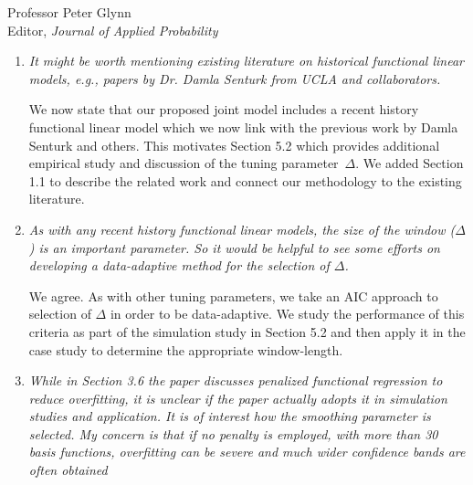 \documentclass[11pt]{letter} %
\begin{document}
\begin{letter}{Professor
	Peter Glynn\\
	Editor, {\em Journal of Applied Probability}}
\begin{enumerate}
\vspace{5mm}
We have added a detailed discussion of related work in Section 1.1, which includes the specific suggestions on relevant works provided by the second referee; specifically, we discuss recent modeling of time-to-event data with functional covariates as well as joint modelling from a functional regression perspective.  We contrast these approaches with our design-based approach which becomes necessary when considering high-frequency sensor processes rather than traditional longitudinal studies as the number of measurement occasions increase from tens to thousands/millions of times per individual.  We connect and contrast our use of subsampling with the general use of subsampling in handling massive data and its recent use in massive data with functional predictors.
\vspace{5mm}

\item {\it It might be worth mentioning existing literature on historical functional linear models, e.g., papers by Dr. Damla Senturk from UCLA and collaborators.}

\vspace{5mm}
We now state that our proposed joint model includes a recent history functional linear model which we now link with the previous work by Damla Senturk and others.  This motivates Section 5.2 which provides additional empirical study and discussion of the tuning parameter~$\Delta$.
We added Section 1.1 to describe the related work and connect our methodology to the existing literature.
\vspace{5mm}

\item {\it As with any recent history functional linear models, the size of the window ($\Delta$) is an important parameter. So it would be helpful to see some efforts on developing a data-adaptive method for the selection of $\Delta$.}

\vspace{5mm}
We agree.  As with other tuning parameters, we take an AIC approach to selection of $\Delta$ in order to be data-adaptive.  We study the performance of this criteria as part of the simulation study in Section 5.2 and then apply it in the case study to determine the appropriate window-length.
\vspace{5mm}

\item {\it While in Section 3.6 the paper discusses penalized functional regression to reduce overfitting, it is unclear if the paper actually adopts it in simulation studies and application. It is of interest how the smoothing parameter is selected. My concern is that if no penalty is employed, with more than 30 basis functions, overfitting can be severe and much wider confidence bands are often obtained}


\end{enumerate}
\end{letter}
\end{document}
